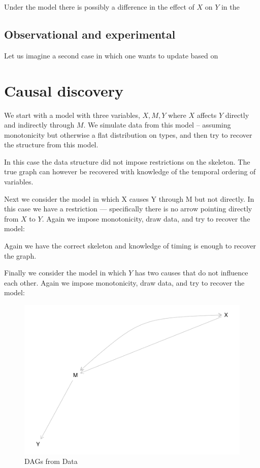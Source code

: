 \documentclass[12pt,]{book}
\begin{document}
Under the model there is possibly a difference in the effect of \(X\) on \(Y\) in the

\hypertarget{observational-and-experimental}{%
\subsection{Observational and experimental}\label{observational-and-experimental}}

Let us imagine a second case in which one wants to update based on

\hypertarget{causal-discovery}{%
\section{Causal discovery}\label{causal-discovery}}

We start with a model with three variables, \(X,M,Y\) where \(X\) affects \(Y\) directly and indirectly through \(M\). We simulate data from this model -- assuming monotonicity but otherwise a flat distribution on types, and then try to recover the structure from this model.

In this case the data structure did not impose restrictions on the skeleton. The true graph can however be recovered with knowledge of the temporal ordering of variables.

Next we consider the model in which X causes Y through M but not directly. In this case we have a restriction --- specifically there is no arrow pointing directly from \(X\) to \(Y\). Again we impose monotonicity, draw data, and try to recover the model:

Again we have the correct skeleton and knowledge of timing is enough to recover the graph.

Finally we consider the model in which \(Y\) has two causes that do not influence each other. Again we impose monotonicity, draw data, and try to recover the model:

\begin{figure}
\centering
\includegraphics{ii_files/figure-latex/unnamed-chunk-114-1.pdf}
\caption{\label{fig:unnamed-chunk-114}DAGs from Data}
\end{figure}
\end{document}
